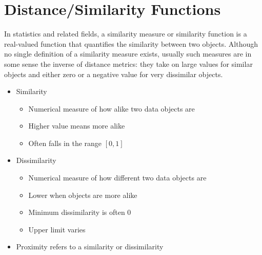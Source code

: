 \section{Distance/Similarity Functions}
In statistics and related fields, a similarity measure or similarity function is 
a real-valued function that quantifies the similarity between two objects. 
Although no single definition of a similarity measure exists, usually such 
measures are in some sense the inverse of distance metrics: they take on large 
values for similar objects and either zero or a negative value for very 
dissimilar objects. \cite{enwiki:similarity}

\begin{itemize}
    \item Similarity
    \begin{itemize}
        \item Numerical measure of how alike two data objects are
        \item Higher value means more alike
        \item Often falls in the range $[0,1]$
    \end{itemize}
    \item Dissimilarity
    \begin{itemize}
        \item Numerical measure of how different two data objects are
        \item Lower when objects are more alike
        \item Minimum dissimilarity is often 0
        \item Upper limit varies
    \end{itemize}
    \item Proximity refers to a similarity or dissimilarity
\end{itemize}

